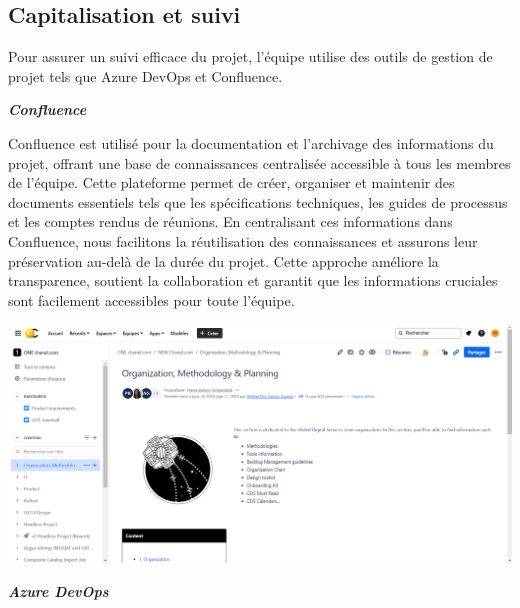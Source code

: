 \subsection{Capitalisation et suivi}

Pour assurer un suivi efficace du projet, l'équipe utilise des outils de gestion de projet tels que Azure DevOps et Confluence.

\textbf{\textbullet \textit{ Confluence}}

Confluence est utilisé pour la documentation et l'archivage des informations du projet, offrant une base de connaissances centralisée accessible à tous les membres de l'équipe. Cette plateforme permet de créer, organiser et maintenir des documents essentiels tels que les spécifications techniques, les guides de processus et les comptes rendus de réunions. En centralisant ces informations dans Confluence, nous facilitons la réutilisation des connaissances et assurons leur préservation au-delà de la durée du projet. Cette approche améliore la transparence, soutient la collaboration et garantit que les informations cruciales sont facilement accessibles pour toute l'équipe.

\begin{center}
    \centering
    \includegraphics[width=19cm]{Figures/Confluence Documentation.png}
\end{center}


\textbf{\textbullet \textit{Azure DevOps}}

